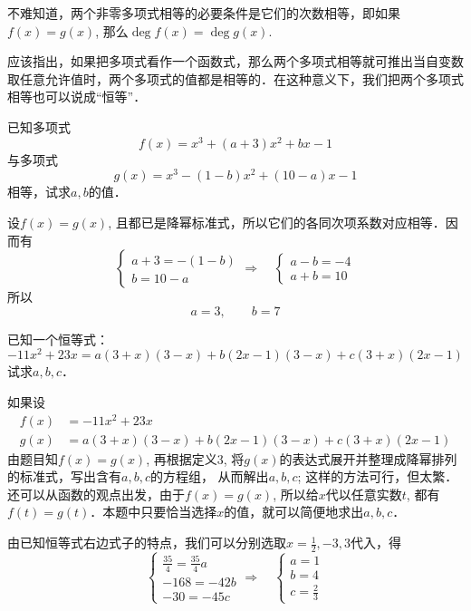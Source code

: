 不难知道，两个非零多项式相等的必要条件是它们的次数相等，即如果$f(x)=g(x)$, 那么$\deg f(x)=\deg g(x)$.

应该指出，如果把多项式看作一个函数式，那么两个多项式相等就可推出当自变数取任意允许值时，两个多项式的值都是相等的．在这种意义下，我们把两个多项式相等也可以说成“恒等”．

\begin{example}
已知多项式
\[f (x) =x^3+ (a+3) x^2+bx-1\]
与多项式
\[g (x) =x^3- (1-b) x^2+ (10-a) x-1\]
相等，试求$a,b$的值．    
\end{example}

\begin{solution}
设$f(x)=g(x)$, 且都已是降幂标准式，所以它们的各同次项系数对应相等．因而有    
\[\begin{cases}
    a+3=-(1-b)\\b=10-a
\end{cases}\Rightarrow\quad
\begin{cases}
    a-b=-4\\ a+b=10
\end{cases}\]
所以
\[a=3,\qquad b=7\]
\end{solution}

\begin{example}
已知一个恒等式：
\[-11x^2+23x=a(3+x)(3-x)+b(2x-1)(3-x)+c(3+x)(2x-1)\]
试求$a,b,c$．
\end{example}

\begin{analyze}
如果设
\[\begin{split}
    f(x)&=-11x^2+23x\\
    g(x)&=a(3+x)(3-x)+b(2x-1)(3-x)+c(3+x)(2x-1)
\end{split}\]
由题目知$f(x)=g(x)$, 再根据定义3, 将$g(x)$的表达式展开并整理成降幂排列的标准式，写出含有$a,b,c$的方程组，
从而解出$a,b,c$; 这样的方法可行，但太繁．还可以从函数的观点出发，由于$f(x)=g(x)$, 所以给$x$代以任意实数$t$, 都有$f(t)=g(t)$．本题中只要恰当选择$x$的值，就可以简便地求出$a,b,c$．
\end{analyze}

\begin{solution}
由已知恒等式右边式子的特点，我们可以分别选取$x=\frac{1}{2},-3, 3$代入，得
\[\begin{cases}
    \frac{35}{4}=\frac{35}{4}a\\
    -168=-42b\\
    -30=-45c
\end{cases}\Rightarrow\quad \begin{cases}
    a=1\\b=4\\c=\frac{2}{3}
\end{cases}\]
\end{solution}

